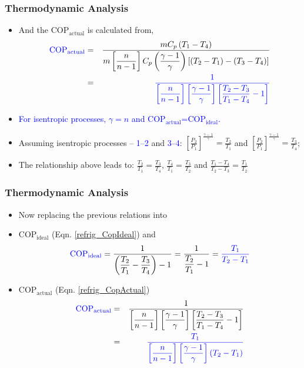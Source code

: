\documentclass[10pt,compress]{beamer}
\newcommand{\frc}{\displaystyle\frac}
\begin{document}
\begin{frame}
 \frametitle{Thermodynamic Analysis}
    \begin{itemize}
     \item <1-> And the COP$_{\text{actual}}$ is calculated from,
      \begin{eqnarray}
       \textcolor{blue}{\text{COP}_{\text{actual}}} &=& \frc{ m C_{p}\left(T_{1}-T_{4}\right)} {m \left[\frc{n}{n-1}\right] C_{p} \left(\frc{\gamma - 1}{\gamma}\right) \left[\left(T_{2}-T_{1}\right)-\left(T_{3}-T_{4}\right)\right]} \nonumber \\
                               &=& \textcolor{blue}{\frc{1}{\left[\frc{n}{n-1}\right]\left[\frc{\gamma-1}{\gamma}\right]\left[\frc{T_{2}-T_{3}}{T_{1}-T_{4}}-1\right]}}
      \label{refrig_CopActual}
      \end{eqnarray}
     \item <2-> \textcolor{blue}{For isentropic processes, $\gamma=n$ and COP$_{\text{actual}}$=COP$_{\text{ideal}}$.}
     \item <3-> Assuming isentropic processes -- \textcolor{blue}{1--2} and \textcolor{blue}{3--4}: $\left[\frc{P_{2}}{P_{1}}\right]^{\frc{\gamma-1}{\gamma}}=\frc{T_{2}}{T_{1}}$ and $\left[\frc{P_{2}}{P_{1}}\right]^{\frc{\gamma-1}{\gamma}}=\frc{T_{3}}{T_{4}}$;
     \item <4-> The relationship above leads to: $\frc{T_{2}}{T_{1}}=\frc{T_{3}}{T_{4}}$, $\frc{T_{4}}{T_{1}}=\frc{T_{3}}{T_{2}}$ and $\frc{T_{1}-T_{4}}{T_{2}-T_{3}}=\frc{T_{1}}{T_{2}}$
    \end{itemize}

\end{frame}

\begin{frame}
 \frametitle{Thermodynamic Analysis}
    \begin{itemize}
     \item <1-> Now replacing the previous relations into
     \item <2-> COP$_{\text{ideal}}$ (Eqn. \ref{refrig_CopIdeal}) and
      \begin{equation}
         \textcolor{blue}{\text{COP}_{\text{ideal}}} = \frc{1}{\left(\frc{T_{2}}{T_{1}}-\frc{T_{3}}{T_{4}}\right)-1} = \frc{1}{\frc{T_{2}}{T_{1}}-1} = \textcolor{blue}{\frc{T_{1}}{T_{2}-T_{1}}} 
      \end{equation}
     \item <3-> COP$_{\text{actual}}$ (Eqn. \ref{refrig_CopActual})
      \begin{eqnarray}
        \textcolor{blue}{\text{COP}_{\text{actual}}} &=& \frc{1}{\left[\frc{n}{n-1}\right]\left[\frc{\gamma-1}{\gamma}\right]\left[\frc{T_{2}-T_{3}}{T_{1}-T_{4}}-1\right]} \nonumber \\
         &=& \textcolor{blue}{\frc{T_{1}}{\left[\frc{n}{n-1}\right]\left[\frc{\gamma-1}{\gamma}\right]\left(T_{2}-T_{1}\right)}}
      \end{eqnarray}
    \end{itemize}

\end{frame}
\end{document}
